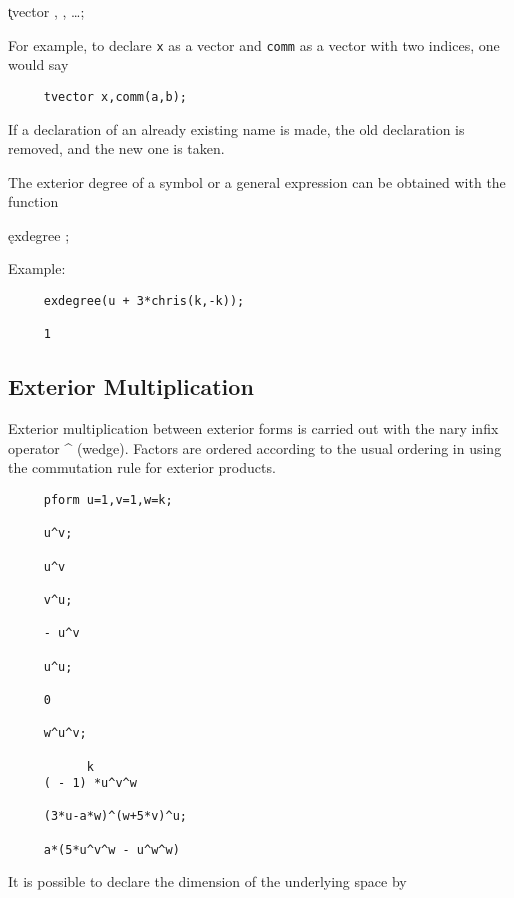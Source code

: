 \hspace*{2em} \k{tvector} , , \ldots;

For example, to declare \texttt{x} as a vector and \texttt{comm} as a vector with
two indices, one would say
\begin{verbatim}
     tvector x,comm(a,b);
\end{verbatim}
If a declaration of an already existing name is made, the old
declaration is removed, and the new one is taken.

The exterior degree of a symbol or a general expression can be obtained
with the function \label{EXDEGREE} 
\hypertarget{operator:EXDEGREE}{}

\hspace*{2em} \k{exdegree} ;

Example:
\begin{verbatim}
     exdegree(u + 3*chris(k,-k));

     1
\end{verbatim}


\subsection{Exterior Multiplication}

Exterior multiplication between exterior forms is carried out with the
nary infix operator \textasciicircum{} (wedge)\label{wedge}.  Factors are ordered
according to the usual ordering in {\REDUCE} using the commutation
rule for exterior products.

\example{}

\begin{verbatim}
     pform u=1,v=1,w=k;

     u^v;

     u^v

     v^u;

     - u^v

     u^u;

     0

     w^u^v;

           k
     ( - 1) *u^v^w

     (3*u-a*w)^(w+5*v)^u;

     a*(5*u^v^w - u^w^w)
\end{verbatim}

It is possible to declare the dimension of the underlying space
by\label{SPACEDIM}  
\hypertarget{command:SPACEDIM}{}

